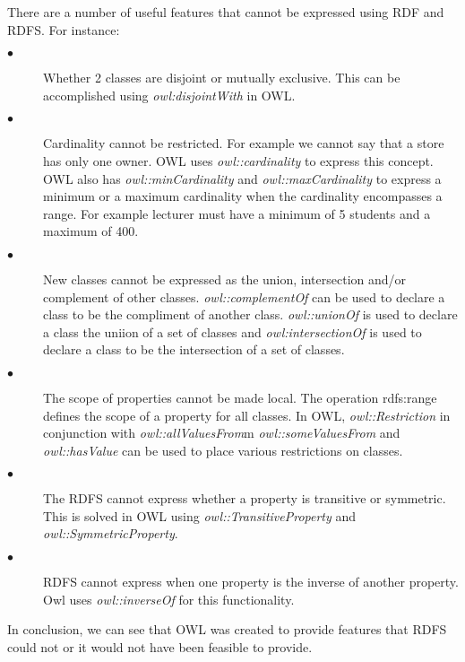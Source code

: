 \documentclass[12pt,a4paper]{article}
\begin{document}
There are a number of useful features that cannot be expressed using RDF and RDFS. For instance: 
\begin{description}
\item[$\bullet$] Whether 2 classes are disjoint or mutually exclusive. This can be accomplished using \emph{owl:disjointWith} in OWL.
\item[$\bullet$] Cardinality cannot be restricted. For example we cannot say that a store has only one owner. OWL uses \emph{owl::cardinality} to express this concept. OWL also has \emph{owl::minCardinality} and \emph{owl::maxCardinality} to express a minimum or a maximum cardinality when the cardinality encompasses a range. For example lecturer must have a minimum of 5 students and a maximum of 400.
\item[$\bullet$] New classes cannot be expressed as the union, intersection and/or complement of other classes. \emph{owl::complementOf} can be used to declare a class to be the compliment of another class. \emph{owl::unionOf} is used to declare a class the uniion of a set of classes and \emph{owl:intersectionOf} is used to declare a class to be the intersection of a set of classes.
\item[$\bullet$] The scope of properties cannot be made local. The operation rdfs:range defines the scope of a property for all classes. In OWL, \emph{owl::Restriction} in conjunction with \emph{owl::allValuesFrom}m \emph{owl::someValuesFrom} and \emph{owl::hasValue} can be used to place various restrictions on classes.
\item[$\bullet$] The RDFS cannot express whether a property is transitive or symmetric. This is solved in OWL using \emph{owl::TransitiveProperty} and \emph{owl::SymmetricProperty}.
\item[$\bullet$] RDFS cannot express when one property is the inverse of another property. Owl uses \emph{owl::inverseOf} for this functionality.
\end{description} 

\citep{Staab2009}

In conclusion, we can see that OWL was created to provide features that RDFS could not or it would not have been feasible to provide. 


\end{document}
